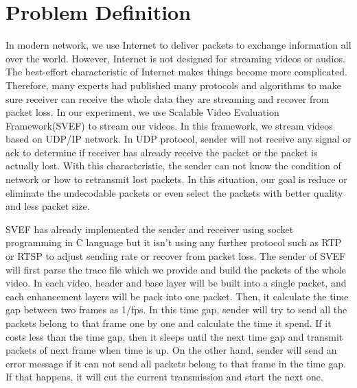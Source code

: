 \section{Problem Definition} \label{sec:problemDefinition}

In modern network, we use Internet to deliver packets to exchange information all over the world. However, Internet is not designed for streaming videos or audios. The best-effort characteristic of Internet makes things become more complicated. Therefore, many experts had published many protocols and algorithms to make sure receiver can receive the whole data they are streaming and recover from packet loss. In our experiment, we use Scalable Video Evaluation Framework(SVEF) to stream our videos. In this framework, we stream videos based on UDP/IP network. In UDP protocol, sender will not receive any signal or ack to determine if receiver has already receive the packet or the packet is actually lost. With this characteristic, the sender can not know the condition of network or how to retransmit lost packets. In this situation, our goal is reduce or eliminate the undecodable packets or even select the packets with better quality and less packet size.

SVEF has already implemented the sender and receiver using socket programming in C language but it isn't using any further protocol such as RTP or RTSP to adjust sending rate or recover from packet loss. The sender of SVEF will first parse the trace file which we provide and build the packets of the whole video. In each video, header and base layer will be built into a single packet, and each enhancement layers will be pack into one packet. Then, it calculate the time gap between two frames as 1/fps. In this time gap, sender will try to send all the packets belong to that frame one by one and calculate the time it spend. If it costs less than the time gap, then it sleeps until the next time gap and transmit packets of next frame when time is up. On the other hand, sender will send an error message if it can not send all packets belong to that frame in the time gap. If that happens, it will cut the current transmission and start the next one.